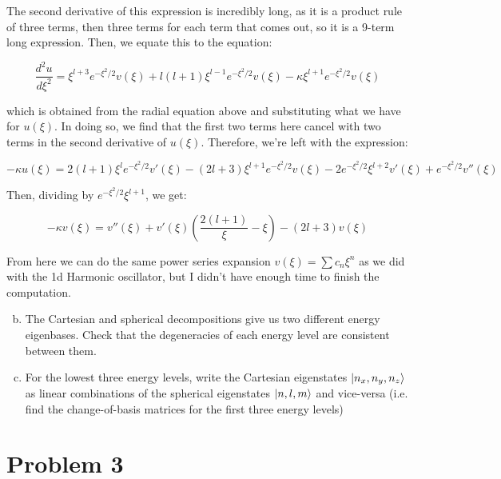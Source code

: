 \documentclass[10pt]{article}
\begin{document}
\begin{solution}
        The second derivative of this expression is incredibly long, as it is a product rule of three terms, then three terms for each term that comes out, so it is a 9-term long expression. Then, we equate this to the equation: 

        \[\frac{d^2u}{d\xi^2} = \xi^{l+3}e^{-\xi^2/2}v(\xi) + l(l+1)\xi^{l-1}e^{-\xi^2/2}v(\xi) - \kappa \xi^{l+1}e^{-\xi^2/2} v(\xi)\] 

        which is obtained from the radial equation above and substituting what we have for $u(\xi)$. In doing so, we find that the first two terms here cancel with two terms in the second derivative of $u(\xi)$. Therefore, we're left with the expression:

        \[ -\kappa u(\xi) = 2(l+1)\xi^l e^{-\xi^2/2}v'(\xi) - (2l+3)\xi^{l+1}e^{-\xi^2/2}v(\xi) - 2 e^{-\xi^2/2}\xi^{l+2}v'(\xi) + e^{-\xi^2/2}v''(\xi)\]

        Then, dividing by $e^{-\xi^2/2}\xi^{l+1}$, we get: 

        \[ -\kappa v(\xi) = v''(\xi) + v'(\xi)\left( \frac{2(l+1)}{\xi} - \xi\right) - (2l+3)v(\xi)\]

        From here we can do the same power series expansion $v(\xi) = \sum c_n \xi^n$ as we did with the 1d Harmonic oscillator, but I didn't have enough time to finish the computation.
    \end{solution}

    \begin{enumerate}[(a)]
        \setcounter{enumi}{1}
        \item The Cartesian and spherical decompositions give us two different energy eigenbases. Check that the degeneracies of each energy level are consistent between them. 
        \item For the lowest three energy levels, write the Cartesian eigenstates $\ket{n_x, n_y, n_z}$ as linear combinations of the spherical eigenstates $\ket{n, l, m}$ and vice-versa (i.e. find the change-of-basis matrices for the first three energy levels)
    \end{enumerate}


    \pagebreak


    \section*{Problem 3}
\end{document}
